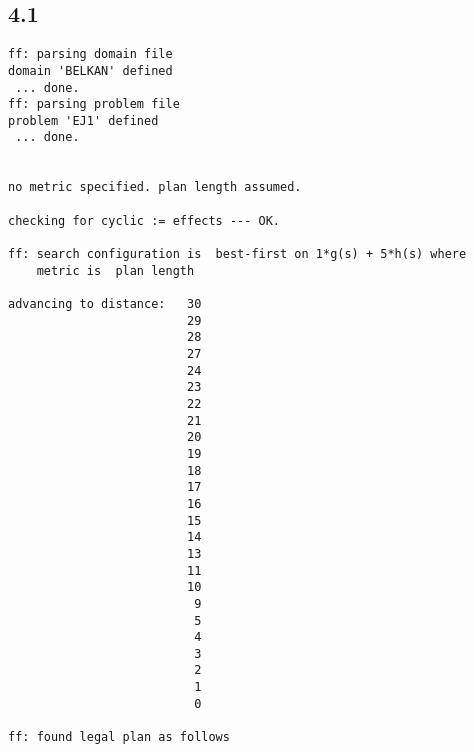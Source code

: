 \documentclass{article}
\begin{document}
\subsection*{4.1}
\begin{lstlisting}
ff: parsing domain file
domain 'BELKAN' defined
 ... done.
ff: parsing problem file
problem 'EJ1' defined
 ... done.


no metric specified. plan length assumed.

checking for cyclic := effects --- OK.

ff: search configuration is  best-first on 1*g(s) + 5*h(s) where
    metric is  plan length

advancing to distance:   30
                         29
                         28
                         27
                         24
                         23
                         22
                         21
                         20
                         19
                         18
                         17
                         16
                         15
                         14
                         13
                         11
                         10
                          9
                          5
                          4
                          3
                          2
                          1
                          0

ff: found legal plan as follows


\end{lstlisting}
\end{document}
